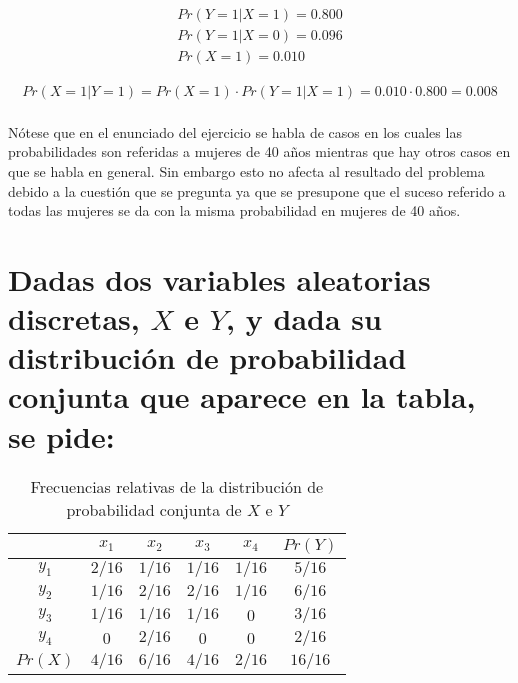 \documentclass{article}
\begin{document}
		\begin{align}
			Pr(Y = 1 | X = 1) = 0.800 \\
			Pr(Y = 1 | X = 0) = 0.096 \\
			Pr(X = 1) = 0.010
		\end{align}

		\begin{align}
			Pr(X = 1 | Y = 1) = Pr(X = 1) \cdot Pr(Y = 1 | X = 1) = 0.010 \cdot 0.800 = 0.008
		\end{align}

		\paragraph{}
		Nótese que en el enunciado del ejercicio se habla de casos en los cuales las probabilidades son referidas a mujeres de 40 años mientras que hay otros casos en que se habla en general. Sin embargo esto no afecta al resultado del problema debido a la cuestión que se pregunta ya que se presupone que el suceso referido a todas las mujeres se da con la misma probabilidad en mujeres de 40 años.

	\section{Dadas dos variables aleatorias discretas, $X$ e $Y$, y dada su distribución de probabilidad conjunta que aparece en la tabla, se pide:}
	\label{sec:e2}

	\begin{table}
		\centering
		\begin{tabular}{ | c || c | c | c | c | c |}
			\hline
			 					& $x_1$ 	& $x_2$ 	& $x_3$ 	& $x_4$ 	& $Pr(Y)$ \\ \hline \hline
				$y_1$ 	&	$2/16$	&	$1/16$	&	$1/16$	&	$1/16$	&	$5/16$ 	\\ \hline
				$y_2$ 	&	$1/16$	&	$2/16$	&	$2/16$	&	$1/16$	&	$6/16$ 	\\ \hline
				$y_3$ 	&	$1/16$	&	$1/16$	&	$1/16$	&	$0$			&	$3/16$ 	\\ \hline
				$y_4$ 	&	$0$			&	$2/16$	&	$0$			&	$0$			&	$2/16$ 	\\ \hline
				$Pr(X)$ &	$4/16$	&	$6/16$	&	$4/16$	&	$2/16$	&	$16/16$ \\
			 \hline
		\end{tabular}
		\caption{Frecuencias relativas de la distribución de probabilidad conjunta de $X$ e $Y$}
		\label{table:e2}

	\end{table}
\end{document}
